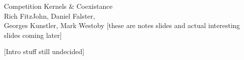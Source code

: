 \documentclass[12pt]{beamer}
\begin{document}
\begin{frame}
  \thispagestyle{empty}
  \begin{center}
    \sf
    {\Huge Competition Kernels \& Coexistance}\\[2ex]
    {\large Rich FitzJohn, Daniel Falster,\\[1ex]
    Georges Kunstler, Mark Westoby}
  \vfill
  [these are notes slides and actual interesting slides coming later]
  \end{center}
\end{frame}

\begin{frame}
  \begin{center}
    [Intro stuff still undecided]
  \end{center}
\end{frame}
\end{document}
